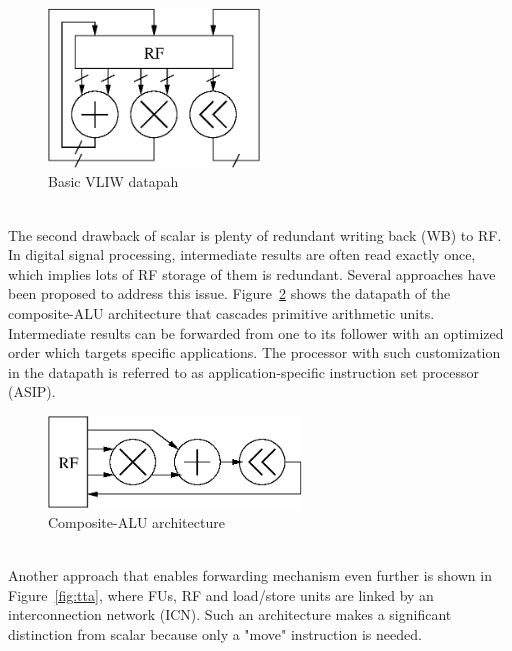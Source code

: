         \vspace{\textfig}
        \begin{figure}[!ht] 
            \centering
            \includegraphics[width=0.5\textwidth]{./figs/vliw.eps}
            \caption{Basic VLIW datapah}
            \label{fig:vliw}
        \end{figure}
        \\\indent
        The second drawback of scalar is plenty of redundant writing back (WB) to RF. 
        In digital signal processing, intermediate results are often read exactly once, which implies lots of RF storage of them is redundant.
        Several approaches have been proposed to address this issue.
        Figure~\ref{fig:cascade} shows the datapath of the composite-ALU architecture that cascades primitive arithmetic units. 
        Intermediate results can be forwarded from one to its follower with an optimized order which targets specific applications.
        The processor with such customization in the datapath is referred to as application-specific instruction set processor (ASIP).
        \vspace{\textfig}
        \begin{figure}[!ht] 
            \centering
            \includegraphics[width=0.6\textwidth]{./figs/cascade.eps}
            \caption{Composite-ALU architecture}
            \label{fig:cascade}
        \end{figure}
        \\\indent
        Another approach that enables forwarding mechanism even further is shown in Figure~\ref{fig:tta}, where FUs, RF and load/store units are linked by an interconnection network (ICN).
        Such an architecture makes a significant distinction from scalar because only a "move" instruction is needed. 
